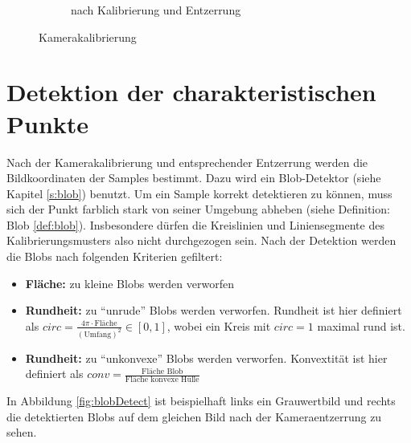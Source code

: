 \begin{figure}[!htb]
\begin{subfigure}{.5\textwidth}
	\caption{nach Kalibrierung und Entzerrung}
	\label{fig:calibUndist}
\end{subfigure}
\caption{Kamerakalibrierung}
\label{fig:calib}
\end{figure}


\section{Detektion der charakteristischen Punkte}

Nach der Kamerakalibrierung und entsprechender Entzerrung werden die Bildkoordinaten der Samples bestimmt. Dazu wird ein Blob-Detektor (siehe Kapitel \ref{s:blob}) benutzt. 
Um ein Sample korrekt detektieren zu können, muss sich der Punkt farblich stark von seiner Umgebung abheben (siehe Definition: Blob \ref{def:blob}). Insbesondere dürfen die Kreislinien und Liniensegmente des Kalibrierungsmusters also nicht durchgezogen sein. Nach der Detektion werden die Blobs nach folgenden Kriterien gefiltert:

\begin{itemize}
	\item \textbf{Fläche:} zu kleine Blobs werden verworfen
	\item \textbf{Rundheit:} zu "`unrude"' Blobs werden verworfen. Rundheit ist hier definiert als $circ = \frac{4\pi\cdot \textrm{Fläche}}{\left(\textrm{Umfang}\right)^2}\in[0,1]$, wobei ein Kreis mit $circ = 1$ maximal rund ist. 
	\item  \textbf{Rundheit:} zu "`unkonvexe"' Blobs werden verworfen. Konvextität ist hier definiert als $conv = \frac{\textrm{Fläche Blob}}{\textrm{Fläche konvexe Hülle}}$
\end{itemize}

In Abbildung \ref{fig:blobDetect} ist beispielhaft links ein Grauwertbild und rechts die detektierten Blobs auf dem gleichen Bild nach der Kameraentzerrung zu sehen.


